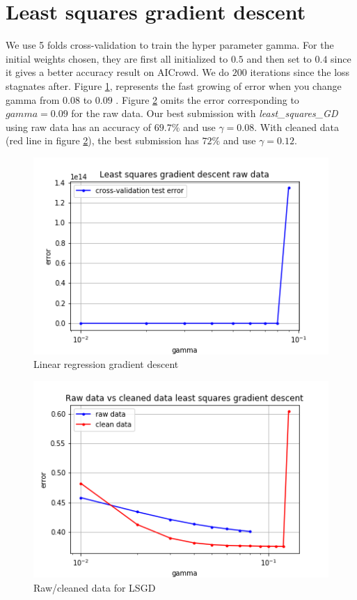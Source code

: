 \documentclass[11pt, a4paper, twocolumn]{article}
\begin{document}
\section{Least squares gradient descent}
We use 5 folds cross-validation
to train the hyper parameter gamma.
For the initial weights chosen, they are first all initialized to $0.5$ and then set to $0.4$ 
since it gives a better accuracy result on AICrowd.
We do $200$ iterations since the loss stagnates after.
Figure \ref{fig:lsgd}, 
represents the fast growing of error 
when you change gamma from $0.08$ to $0.09$ .
Figure \ref{fig:raw_clean_lsgd} omits the error corresponding to $gamma = 0.09$ for the raw data.
Our best submission with \textit{least\_squares\_GD} using raw data 
has an accuracy of $69.7\%$ and use $\gamma = 0.08$.
With cleaned data (red line in figure \ref{fig:raw_clean_lsgd}), 
the best submission has $72\%$ and use $\gamma = 0.12$.

\begin{figure}[h!]
  \includegraphics[width=\linewidth]{raw_data_least_squares_GD.png}
  \caption{Linear regression gradient descent}
  \label{fig:lsgd}
\end{figure}
\begin{figure}[h!]
  \includegraphics[width=\linewidth]{raw_vs_clean_lsgd.png}
  \caption{Raw/cleaned data for LSGD}
    \label{fig:raw_clean_lsgd}
\end{figure}
\end{document}
